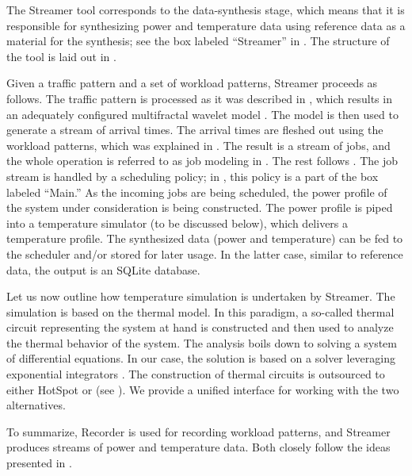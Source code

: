 
The Streamer tool corresponds to the data-synthesis stage, which means that it
is responsible for synthesizing power and temperature data using reference data
as a material for the synthesis; see the box labeled ``Streamer'' in
. The structure of the tool is laid out in .

Given a traffic pattern and a set of workload patterns, Streamer proceeds as
follows. The traffic pattern is processed as it was described in ,
which results in an adequately configured multifractal wavelet model
\cite{riedi1999}. The model is then used to generate a stream of arrival times.
The arrival times are fleshed out using the workload patterns, which was
explained in . The result is a stream of jobs, and the whole
operation is referred to as job modeling in . The rest follows
. The job stream is handled by a scheduling policy; in
, this policy is a part of the box labeled ``Main.'' As the
incoming jobs are being scheduled, the power profile of the system under
consideration is being constructed. The power profile is piped into a
temperature simulator (to be discussed below), which delivers a temperature
profile. The synthesized data (power and temperature) can be fed to the
scheduler and/or stored for later usage. In the latter case, similar to
reference data, the output is an SQLite database.

Let us now outline how temperature simulation is undertaken by Streamer. The
simulation is based on the thermal  model. In this paradigm, a so-called
thermal  circuit representing the system at hand is constructed and then
used to analyze the thermal behavior of the system. The analysis boils down to
solving a system of differential equations. In our case, the solution is based
on a solver leveraging exponential integrators \cite{ukhov2014}. The
construction of thermal circuits is outsourced to either HotSpot
\cite{skadron2004} or  \cite{sridhar2010} (see ). We
provide a unified interface for working with the two alternatives.

To summarize, Recorder is used for recording workload patterns, and Streamer
produces streams of power and temperature data. Both closely follow the ideas
presented in .
